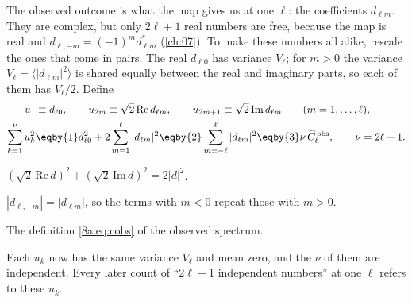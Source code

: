 The observed outcome is what the map gives us at one $\ell$: the coefficients $d_{\ell m}$. They
are complex, but only $2\ell+1$ real numbers are free, because the map is real and
$d_{\ell,-m}=(-1)^md^*_{\ell m}$ (\cref{ch:07}). To make these numbers all alike, rescale the
ones that come in pairs. The real $d_{\ell0}$ has variance $V_\ell$; for $m>0$ the variance
$V_\ell=\langle|d_{\ell m}|^2\rangle$ is shared equally between the real and imaginary parts, so
each of them has $V_\ell/2$. Define
\begin{align}
  u_1&\equiv d_{\ell0},\qquad
  u_{2m}\equiv\sqrt2\,\mathrm{Re}\,d_{\ell m},\qquad
  u_{2m+1}\equiv\sqrt2\,\mathrm{Im}\,d_{\ell m}\qquad(m=1,\dots,\ell),
  \label{8a:eq:u-def}\\
  \sum_{k=1}^{\nu}u_k^2
  &\eqby{1}d_{\ell0}^2+2\sum_{m=1}^{\ell}|d_{\ell m}|^2
   \eqby{2}\sum_{m=-\ell}^{\ell}|d_{\ell m}|^2
   \eqby{3}\nu\,\widehat C^{\,\rm obs}_\ell ,\qquad\nu=2\ell+1 .
  \nonumber
\end{align}
\begin{explain}
  \item $(\sqrt2\,\mathrm{Re}\,d)^2+(\sqrt2\,\mathrm{Im}\,d)^2=2|d|^2$.
  \item $|d_{\ell,-m}|=|d_{\ell m}|$, so the terms with $m<0$ repeat those with $m>0$.
  \item The definition \eqref{8a:eq:cobs} of the observed spectrum.
\end{explain}
Each $u_k$ now has the same variance $V_\ell$ and mean zero, and the $\nu$ of them are
independent. Every later count of ``$2\ell+1$ independent numbers'' at one $\ell$ refers to these
$u_k$.

